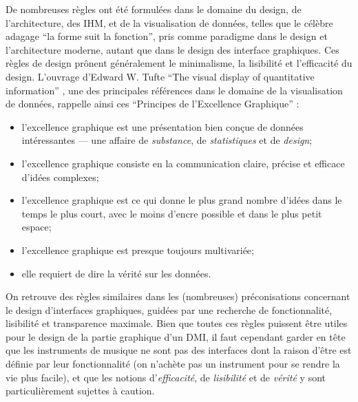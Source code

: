 \noindent De nombreuses règles ont été formulées dans le domaine du design, de l'architecture, des \gls{IHM}, et de la visualisation de données, telles que le célèbre adagage ``la forme suit la fonction'', pris comme paradigme dans le design et l'architecture moderne, autant que dans le design des interface graphiques. Ces règles de design prônent généralement le minimalisme, la lisibilité et l'efficacité du design. L'ouvrage d'Edward W. Tufte ``The visual display of quantitative information'' \cite{tufte_visual_2001}, une des principales références dans le domaine de la visualisation de données, rappelle ainsi ces ``Principes de l'Excellence Graphique'' :
\vspace{-1em}
\begin{itemize}[noitemsep]
	\item l'excellence graphique est une présentation bien conçue de données intéressantes — une affaire de \textit{substance}, de \textit{statistiques} et de \textit{design};
	\item l'excellence graphique consiste en la communication claire, précise et efficace d'idées complexes;
	\item l'excellence graphique est ce qui donne le plus grand nombre d'idées dans le temps le plus court, avec le moins d'encre possible et dans le plus petit espace;
	\item l'excellence graphique est presque toujours multivariée;
	\item elle requiert de dire la vérité sur les données.
\end{itemize}

\noindent On retrouve des règles similaires dans les (nombreuses) préconisations concernant le design d'interfaces graphiques, guidées par une recherche de fonctionnalité, lisibilité et transparence maximale. Bien que toutes ces règles puissent être utiles pour le design de la partie graphique d'un \gls{DMI}, il faut cependant garder en tête que les instruments de musique ne sont pas des interfaces dont la raison d'être est définie par leur fonctionnalité (on n'achète pas un instrument pour se rendre la vie plus facile), et que les notions d'\textit{efficacité}, de \textit{lisibilité} et de \textit{vérité} y sont particulièrement sujettes à caution.


